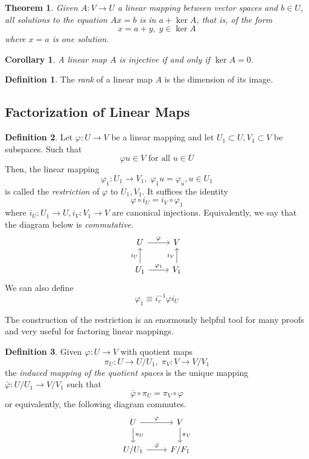 \documentclass{article}
\newtheorem{theorem}{Theorem}[section]
\newtheorem{corollary}{Corollary}[theorem]
\theoremstyle{remark}
\theoremstyle{definition}
\newtheorem{definition}{Definition}[section]
\begin{document}
\begin{theorem}
Given $A: V \longrightarrow U$ a linear mapping between vector spaces and $b \in U$, all solutions to the equation $Ax = b$ is in $a + \ker A$, that is, of the form 
\[ x = a + y, \; y \in \ker A\]
where $x = a$ is one solution. 
\end{theorem}

\begin{corollary}
A linear map $A$ is injective if and only if $\ker A = 0$.
\end{corollary}

\begin{definition}
The \textit{rank} of a linear map $A$ is the dimension of its image. 
\end{definition}

\subsection{Factorization of Linear Maps}
\begin{definition}
Let $\varphi: U \longrightarrow V$ be a linear mapping and let $U_1 \subset U, V_1 \subset V$ be subspaces. Such that \[\varphi u \in V \text{ for all } u \in U\]
Then, the linear mapping 
\[\varphi_1: U_1 \longrightarrow V_1, \; \varphi_1 u = \varphi_u, u \in U_1\]
is called the \textit{restriction} of $\varphi$ to $U_1, V_1$. It suffices the identity
\[\varphi \circ i_U = i_V \circ \varphi_1\]
where $i_U: U_1 \longrightarrow U, i_V: V_1 \longrightarrow V$ are canonical injections. Equivalently, we say that the diagram below is \textit{commutative}. 
\[
  \begin{tikzcd}
    U \arrow{r}{\varphi} & V \\
    U_1 \arrow{u}{i_U} \arrow{r}{\varphi_1} & V_1 \arrow{u}{i_V}
  \end{tikzcd}
\]
We can also define 
\[\varphi_1 \equiv i_v^{-1} \varphi i_U\]
\end{definition}

The construction of the restriction is an enormously helpful tool for many proofs and very useful for factoring linear mappings. 

\begin{definition}
Given $\varphi: U \longrightarrow V$ with quotient maps 
\[\pi_U: U \longrightarrow U / U_1, \; \pi_V: V \longrightarrow V / V_1 \]
the \textit{induced mapping of the quotient spaces} is the unique mapping $\bar{\varphi}: U/U_1 \longrightarrow V / V_1$ such that 
\[\bar{\varphi} \circ \pi_U = \pi_V \circ \varphi\]
or equivalently, the following diagram commutes. 
\[\begin{tikzcd}
    U \arrow{r}{\varphi} \arrow{d}{\pi_U} & V \arrow{d}{\pi_V}\\
    U / U_1 \arrow{r}{\bar{\varphi}} & F / F_1
\end{tikzcd}\]
\end{definition} 
\end{document}
